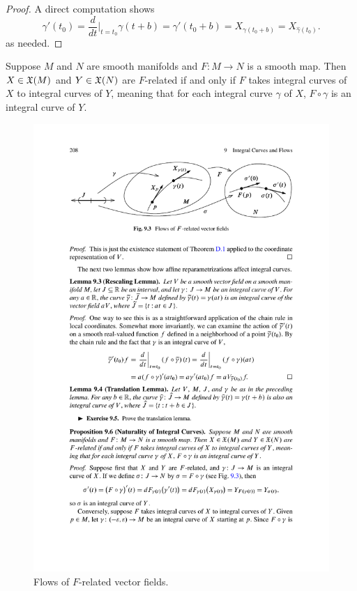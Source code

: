 \begin{proof}
A direct computation shows
\[\widehat{\gamma}'(t_0)=\frac{d}{dt}|_{t=t_0}\gamma(t+b)=\gamma'(t_0+b)=X_{\gamma(t_0+b)}=X_{\widehat{\gamma}(t_0)}.\]
as needed.
\end{proof}
\begin{proposition}\label{integral curve naturality}
Suppose $M$ and $N$ are smooth manifolds and $F:M\to N$ is a smooth map. Then $X\in\mathfrak{X}(M)$ and $Y\in\mathfrak{X}(N)$ are $F$-related if and only if $F$ takes integral curves of $X$ to integral curves of $Y$, meaning that for each integral curve $\gamma$ of $X$, $F\circ\gamma$ is an integral curve of $Y$.
\end{proposition}
\begin{figure}[htbp]
\centering
\includegraphics{pictures/integral-curve}
\caption{Flows of $F$-related vector fields.}
\end{figure}
